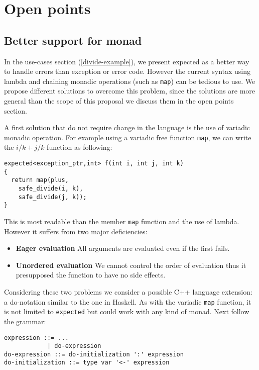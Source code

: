 \documentclass[a4paper,10pt]{article}
\newcommand{\cpp}[1]{\lstinline{#1}}
\begin{document}
\section{Open points}

\subsection{Better support for monad}
\label{better-support-for-monad}

In the use-cases section (\ref{divide-example}), we present expected as a better way to handle errors than exception or error code. However the current syntax using lambda and chaining monadic operations (such as \cpp{map}) can be tedious to use. We propose different solutions to overcome this problem, since the solutions are more general than the scope of this proposal we discuss them in the open points section.

A first solution that do not require change in the language is the use of variadic monadic operation. For example using a variadic free function \cpp{map}, we can write the $i/k + j/k$ function as following:

\begin{lstlisting}
expected<exception_ptr,int> f(int i, int j, int k)
{
  return map(plus,
    safe_divide(i, k), 
    safe_divide(j, k));
}
\end{lstlisting}

This is most readable than the member \cpp{map} function and the use of lambda. However it suffers from two major deficiencies:

\begin{itemize}
\item \textbf{Eager evaluation} All arguments are evaluated even if the first fails.
\item \textbf{Unordered evaluation} We cannot control the order of evaluation thus it presupposed the function to have no side effects.
\end{itemize}

Considering these two problems we consider a possible C++ language extension: a do-notation similar to the one in Haskell. As with the variadic \cpp{map} function, it is not limited to \cpp{expected} but could work with any kind of monad. Next follow the grammar:

\begin{lstlisting}
expression ::= ...
            | do-expression
do-expression ::= do-initialization ':' expression
do-initialization ::= type var '<-' expression
\end{lstlisting}
\end{document}
